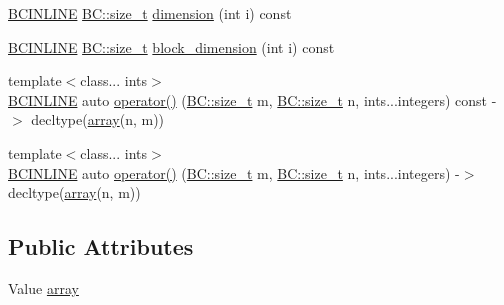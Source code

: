 \begin{DoxyCompactItemize}
\item 
\hyperlink{BlackCat__Common_8h_a6699e8b0449da5c0fafb878e59c1d4b1}{B\+C\+I\+N\+L\+I\+NE} \hyperlink{namespaceBC_a6007cbc4eeec401a037b558910a56173}{B\+C\+::size\+\_\+t} \hyperlink{structBC_1_1tensors_1_1exprs_1_1Unary__Expression_3_01oper_1_1transpose_3_01System__Tag_01_4_00_01Value_01_4_a82523dd4e77b3aa0a331965cd6a138a3}{dimension} (int i) const 
\item 
\hyperlink{BlackCat__Common_8h_a6699e8b0449da5c0fafb878e59c1d4b1}{B\+C\+I\+N\+L\+I\+NE} \hyperlink{namespaceBC_a6007cbc4eeec401a037b558910a56173}{B\+C\+::size\+\_\+t} \hyperlink{structBC_1_1tensors_1_1exprs_1_1Unary__Expression_3_01oper_1_1transpose_3_01System__Tag_01_4_00_01Value_01_4_ab0c6a3e7e86c0a4e618662cf22b85d5b}{block\+\_\+dimension} (int i) const 
\item 
{\footnotesize template$<$class... ints$>$ }\\\hyperlink{BlackCat__Common_8h_a6699e8b0449da5c0fafb878e59c1d4b1}{B\+C\+I\+N\+L\+I\+NE} auto \hyperlink{structBC_1_1tensors_1_1exprs_1_1Unary__Expression_3_01oper_1_1transpose_3_01System__Tag_01_4_00_01Value_01_4_a080e6d9ead1fbcb49dd8c7fcd745ef75}{operator()} (\hyperlink{namespaceBC_a6007cbc4eeec401a037b558910a56173}{B\+C\+::size\+\_\+t} m, \hyperlink{namespaceBC_a6007cbc4eeec401a037b558910a56173}{B\+C\+::size\+\_\+t} n, ints...\+integers) const -\/$>$ decltype(\hyperlink{structBC_1_1array}{array}(n, m))
\item 
{\footnotesize template$<$class... ints$>$ }\\\hyperlink{BlackCat__Common_8h_a6699e8b0449da5c0fafb878e59c1d4b1}{B\+C\+I\+N\+L\+I\+NE} auto \hyperlink{structBC_1_1tensors_1_1exprs_1_1Unary__Expression_3_01oper_1_1transpose_3_01System__Tag_01_4_00_01Value_01_4_aca65b6ceb2771a668b8c0de903a7e2f6}{operator()} (\hyperlink{namespaceBC_a6007cbc4eeec401a037b558910a56173}{B\+C\+::size\+\_\+t} m, \hyperlink{namespaceBC_a6007cbc4eeec401a037b558910a56173}{B\+C\+::size\+\_\+t} n, ints...\+integers) -\/$>$ decltype(\hyperlink{structBC_1_1array}{array}(n, m))
\end{DoxyCompactItemize}
\subsection*{Public Attributes}
\begin{DoxyCompactItemize}
\item 
Value \hyperlink{structBC_1_1tensors_1_1exprs_1_1Unary__Expression_3_01oper_1_1transpose_3_01System__Tag_01_4_00_01Value_01_4_acfddbab8213e2bbc4eb09cdec15945be}{array}
\end{DoxyCompactItemize}
